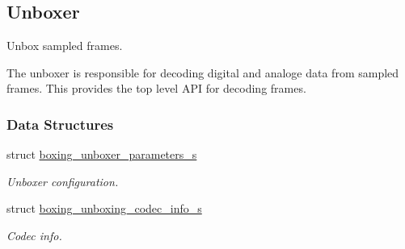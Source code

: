 \hypertarget{group__unboxer}{
\subsection{Unboxer}
\label{group__unboxer}
}


Unbox sampled frames.

The unboxer is responsible for decoding digital and analoge data from sampled frames. This provides the top level API for decoding frames.  
\subsubsection*{Data Structures}
\begin{DoxyCompactItemize}
\item 
struct \hyperlink{structboxing__unboxer__parameters__s}{boxing\_\-unboxer\_\-parameters\_\-s}
\begin{DoxyCompactList}\small\item\em Unboxer configuration. \item\end{DoxyCompactList}\item 
struct \hyperlink{structboxing__unboxing__codec__info__s}{boxing\_\-unboxing\_\-codec\_\-info\_\-s}
\begin{DoxyCompactList}\small\item\em Codec info. \item\end{DoxyCompactList}\end{DoxyCompactItemize}
